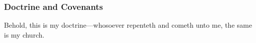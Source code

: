 				
				
		
	
		
		
	\subsubsection{Doctrine and Covenants} %
		\label{CHURCH-DC}
	
		
		\begin{compactdesc}
			\item[{\hyperref[DC10-67]{DC 10:67}}] Behold, this is my doctrine---whosoever repenteth and cometh unto me, the same is my church.
		\end{compactdesc}
		
	
